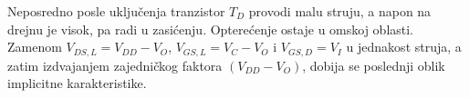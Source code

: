 Neposredno posle uključenja tranzistor $T_D$ provodi malu struju, a napon na drejnu je visok, pa radi u zasićenju. Opterećenje ostaje u omskoj oblasti. Zamenom $V_{DS,L}=V_{DD}-V_O$, $V_{GS,L}=V_C-V_O$ i $V_{GS,D}=V_I$ u jednakost struja, a zatim izdvajanjem zajedničkog faktora $(V_{DD}-V_O)$, dobija se poslednji oblik implicitne karakteristike.
